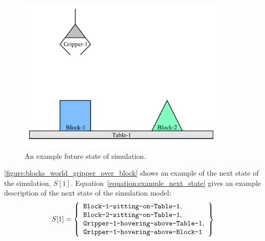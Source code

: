 \begin{figure}[bth]
\includegraphics[width=10cm]{gfx/blocks_world_gripper_over_block}
\caption{An example future state of simulation.}
\label{figure:blocks_world_gripper_over_block}
\end{figure}
\autoref{figure:blocks_world_gripper_over_block} shows an example of
the next state of the simulation, $S[1]$.
Equation~\ref{equation:example_next_state} gives an example
description of the next state of the simulation model:
\begin{equation}
\label{equation:example_next_state}
S[1] =
  \left\{
    \begin{array}{l}
      \text{{\tt Block-1-sitting-on-Table-1}}, \\
      \text{{\tt Block-2-sitting-on-Table-1}}, \\
      \text{{\tt Gripper-1-hovering-above-Table-1}}, \\
      \text{{\tt Gripper-1-hovering-above-Block-1}}
    \end{array}
  \right\}
\end{equation}

